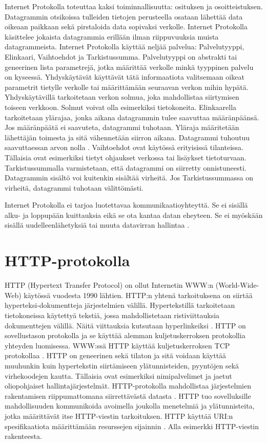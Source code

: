 \documentclass[utf8]{gradu3}
\begin{document}
Internet Protokolla toteuttaa kaksi toiminnallisuutta: osituksen ja osoitteistuksen. Datagrammin otsikoissa tulleiden tietojen perusteella osataan lähettää data oikeaan paikkaan sekä pirstaloida data sopivaksi verkolle. Internet Protokolla käsittelee jokaista datagrammia erillään ilman riippuvuuksia muista datagrammeista. Internet Protokolla käyttää neljää palvelua: Palvelutyyppi, Elinkaari, Vaihtoehdot ja Tarkistussumma. Palvelutyyppi on abstrakti tai geneerinen lista parametrejä, jotka määrittää verkolle minkä tyyppinen palvelu on kyseessä. Yhdyskäytävät käyttävät tätä informaatiota valitsemaan oikeat parametrit tietylle verkolle tai määrittämään seuraavan verkon mihin hypätä. Yhdyskäytävillä tarkoitetaan verkon solmua, joka mahdollistaa siirtymisen toiseen verkkoon. Solmut voivat olla esimerkiksi tietokoneita. Elinkaarella tarkoitetaan ylärajaa, jonka aikana datagrammin tulee saavuttaa määränpäänsä. Jos määränpäätä ei saavuteta, datagrammi tuhotaan. Yläraja määritetään lähettäjän toimesta ja sitä vähennetään siirron aikana. Datagrammi tuhoutuu saavuttaessan arvon nolla \parencite{internet_protocol}. Vaihtoehdot ovat käytössä erityisissä tilanteissa. Tällaisia ovat esimerkiksi tietyt ohjaukset verkossa tai lisäykset tietoturvaan. Tarkistussummalla varmistetaan, että datagrammi on siirretty onnistuneesti. Datagrammin sisältö voi kuitenkin sisältää virheitä. Jos Tarkistussummassa on virheitä, datagrammi tuhotaan välittömästi. 

Internet Protokolla ei tarjoa luotettavaa kommunikaatioyhteyttä. Se ei sisällä alku- ja loppupään kuittauksia eikä se ota kantaa datan eheyteen. Se ei myöskään sisällä uudelleenlähetyksiä tai muuta datavirran hallintaa \parencite{internet_protocol}.

\section{HTTP-protokolla}
HTTP (Hypertext Transfer Protocol) on ollut Internetin WWW:n (World-Wide-Web) käytössä vuodesta 1990 lähtien. HTTP:n yhtenä tarkoituksena on siirtää hyperteksi-dokumentteja järjestelmien välillä. Hypertekstillä tarkoitetaan tietokoneissa käytettyä tekstiä, jossa mahdollistetaan ristiviittauksia dokumenttejen välillä. Näitä viittauksia kutsutaan hyperlinkeiksi \parencite{hypertext}. HTTP on sovellustason protokolla ja se käyttää alemman kuljetuskerroksen protokollia yhteyden luomisessa. WWW:ssä HTTP käyttää kuljetuskerroksen TCP protokollaa \parencite{w3http}. HTTP on geneerinen sekä tilaton ja sitä voidaan käyttää muuhunkin kuin hypertekstin siirtämiseen ylätunnisteiden, pyyntöjen sekä virhekoodejen kautta. Tällaisia ovat esimerkiksi nimipalvelimet ja jaetut oliopohjaiset hallintajärjestelmät. HTTP-protokolla mahdollistaa järjestelmien rakentamisen riippumattomana siirrettävästä datasta \parencite{http}. HTTP tuo sovelluksille mahdollisuuden kommunikoida avoimella joukolla menetelmiä ja ylätunnisteita, jotka määrittävät itse HTTP-viestin tarkoituksen. HTTP käyttää URI:n spesifikaatiota määrittämään resurssejen sijainnin \parencite{uri}. Alla esimerkki HTTP-viestin rakenteesta.
\end{document}
